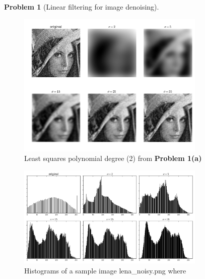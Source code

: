 \documentclass[10pt]{article}
\theoremstyle{plain}
\theoremstyle{definition}
\newtheorem{prob}{Problem}
\numberwithin{equation}{section}
\begin{document}
\begin{prob}[Linear filtering for image denoising]
\begin{figure}[p]
\begin{center}
    \end{center}
\end{figure}
\begin{figure}[p]
    \begin{center}
        \includegraphics[width=0.8\textwidth]{varspread}
        \caption{Least squares polynomial degree (2) from \textbf{Problem 1(a)}}
    \end{center}
\end{figure}

\begin{figure}[p]
    \begin{center}
        \includegraphics[width=0.8\textwidth]{varspread-hists}
        \caption{Histograms of a sample image \textsf{lena\_noisy.png} where }
    \end{center}
\end{figure}

\end{prob}
\end{document}
